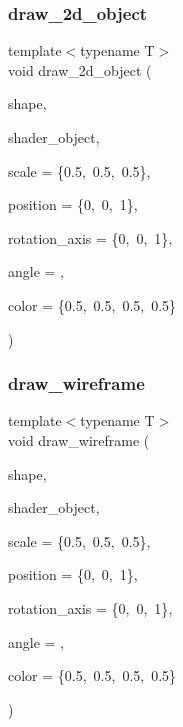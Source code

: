 \subsubsection{\texorpdfstring{draw\+\_\+2d\+\_\+object}{draw\_2d\_object}}
{\footnotesize\ttfamily template$<$typename T$>$ \\
void draw\+\_\+2d\+\_\+object (\begin{DoxyParamCaption}\item[{\mbox{\hyperlink{classShape}{Shape}}$<$ T $>$ \&}]{shape,  }\item[{\mbox{\hyperlink{classShader}{Shader}}$<$ \mbox{\hyperlink{render_8hpp_a24e288e18eb7b6e01de7565001fedb60aa98862073f71a928bad5099cc3e1c2ed}{R\+E\+N\+D\+E\+R\+\_\+\+T\+Y\+P\+E\+::\+U\+N\+I\+F\+O\+R\+M\+\_\+\+C\+O\+L\+OR}} $>$ \&}]{shader\+\_\+object,  }\item[{std\+::array$<$ float, 3 $>$}]{scale = {\ttfamily \{0.5,~0.5,~0.5\}},  }\item[{std\+::array$<$ float, 3 $>$}]{position = {\ttfamily \{0,~0,~1\}},  }\item[{std\+::array$<$ float, 3 $>$}]{rotation\+\_\+axis = {\ttfamily \{0,~0,~1\}},  }\item[{float}]{angle = {},  }\item[{glm\+::vec4}]{color = {\ttfamily \{0.5,~0.5,~0.5,~0.5\}} }\end{DoxyParamCaption})\hspace{0.3cm}{\ttfamily [friend]}}

\mbox{\label{classShape_ad57e4dd441b60269c43114f31ffa6085}} 
\subsubsection{\texorpdfstring{draw\+\_\+wireframe}{draw\_wireframe}}
{\footnotesize\ttfamily template$<$typename T$>$ \\
void draw\+\_\+wireframe (\begin{DoxyParamCaption}\item[{\mbox{\hyperlink{classShape}{Shape}}$<$ T $>$ \&}]{shape,  }\item[{\mbox{\hyperlink{classShader}{Shader}}$<$ \mbox{\hyperlink{render_8hpp_a24e288e18eb7b6e01de7565001fedb60aa98862073f71a928bad5099cc3e1c2ed}{R\+E\+N\+D\+E\+R\+\_\+\+T\+Y\+P\+E\+::\+U\+N\+I\+F\+O\+R\+M\+\_\+\+C\+O\+L\+OR}} $>$ \&}]{shader\+\_\+object,  }\item[{std\+::array$<$ float, 3 $>$}]{scale = {\ttfamily \{0.5,~0.5,~0.5\}},  }\item[{std\+::array$<$ float, 3 $>$}]{position = {\ttfamily \{0,~0,~1\}},  }\item[{std\+::array$<$ float, 3 $>$}]{rotation\+\_\+axis = {\ttfamily \{0,~0,~1\}},  }\item[{float}]{angle = {},  }\item[{glm\+::vec4}]{color = {\ttfamily \{0.5,~0.5,~0.5,~0.5\}} }\end{DoxyParamCaption})\hspace{0.3cm}{\ttfamily [friend]}}



